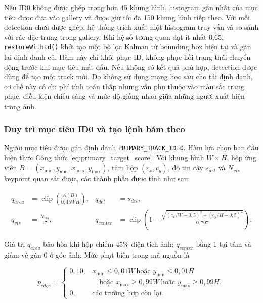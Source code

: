Nếu ID0 không được ghép trong hơn 45 khung hình, histogram gần nhất của mục tiêu được đưa vào gallery và được giữ tối đa 150 khung hình tiếp theo. Với mỗi detection chưa được ghép, hệ thống trích xuất một histogram truy vấn và so sánh với các đặc trưng trong gallery. Khi hệ số tương quan đạt ít nhất 0,65, \texttt{restoreWithId()} khởi tạo một bộ lọc Kalman từ bounding box hiện tại và gán lại định danh cũ. Hàm này chỉ khôi phục ID, không phục hồi trạng thái chuyển động trước khi mục tiêu mất dấu. Nếu không có kết quả phù hợp, detection được dùng để tạo một track mới. Do không sử dụng mạng học sâu cho tái định danh, cơ chế này có chi phí tính toán thấp nhưng vẫn phụ thuộc vào màu sắc trang phục, điều kiện chiếu sáng và mức độ giống nhau giữa những người xuất hiện trong ảnh.

\subsubsection{Duy trì mục tiêu ID0 và tạo lệnh bám theo}

Người mục tiêu được gán định danh \texttt{PRIMARY\_TRACK\_ID=0}. Hàm lựa chọn ban đầu hiện thực Công thức \ref{eq:primary_target_score}. Với khung hình $W\times H$, hộp ứng viên $B=(x_{\min},y_{\min},x_{\max},y_{\max})$, tâm hộp $(c_x,c_y)$, độ tin cậy $s_{det}$ và $N_{vis}$ keypoint quan sát được, các thành phần được tính như sau:

\begin{align}
q_{area}&=\operatorname{clip}\!\left(\frac{A(B)}{0{,}45WH}\right),
&q_{det}&=s_{det},
\label{eq:target_area_detection_quality}\\
q_{vis}&=\frac{N_{vis}}{17},
&q_{center}&=\operatorname{clip}\!\left(
1-\frac{\sqrt{(c_x/W-0{,}5)^2+(c_y/H-0{,}5)^2}}{0{,}707}\right).
\label{eq:target_visibility_centrality}
\end{align}

Giá trị $q_{area}$ bão hòa khi hộp chiếm $45\%$ diện tích ảnh; $q_{center}$ bằng $1$ tại tâm và giảm về gần $0$ ở góc ảnh. Mức phạt biên trong mã nguồn là

\begin{equation}
p_{edge}=\begin{cases}
0{,}10, & x_{\min}\leq0{,}01W\ \text{hoặc }y_{\min}\leq0{,}01H\\
         & \quad\text{hoặc }x_{\max}\geq0{,}99W\ \text{hoặc }y_{\max}\geq0{,}99H,\\
0,       & \text{các trường hợp còn lại.}
\end{cases}
\label{eq:target_edge_penalty}
\end{equation}

